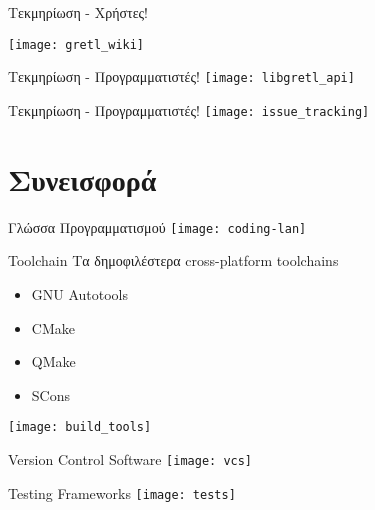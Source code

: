 \documentclass[xetex]{beamer}
\begin{document}
\begin{frame}{Τεκμηρίωση - Χρήστες!}
	\begin{center}
    	\texttt{[image: gretl\_wiki]}
    \end{center}
\end{frame}

\begin{frame}{Τεκμηρίωση - Προγραμματιστές!}
	\texttt{[image: libgretl\_api]}
\end{frame}

\begin{frame}{Τεκμηρίωση - Προγραμματιστές!}
    \texttt{[image: issue\_tracking]}
\end{frame}

\section{Συνεισφορά}

\begin{frame}{Γλώσσα Προγραμματισμού}
	\texttt{[image: coding-lan]}
\end{frame}

\begin{frame}{Toolchain}
	Τα δημοφιλέστερα cross-platform toolchains
	\begin{itemize}
		\item GNU Autotools
		\item CMake
		\item QMake
		\item SCons
	\end{itemize}
	\begin{center}
		\texttt{[image: build\_tools]}
	\end{center}
\end{frame}

\begin{frame}{Version Control Software}
	\texttt{[image: vcs]}
\end{frame}

\begin{frame}{Testing Frameworks}
	\texttt{[image: tests]}
\end{frame}
\end{document}
